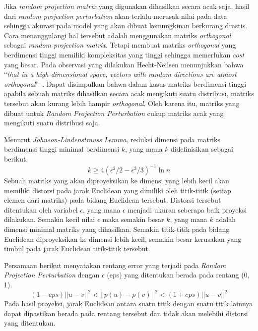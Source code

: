 Jika \textit{random projection matrix} yang digunakan dihasilkan secara acak saja, hasil dari \textit{random projection perturbation} akan terlalu merusak nilai pada data sehingga akurasi pada model yang akan dibuat kemungkinan berkurang drastis. Cara menanggulangi hal tersebut adalah menggunakan matriks \textit{orthogonal} sebagai \textit{random projection matrix}. Tetapi membuat matriks \textit{orthogonal} yang berdimensi tinggi memiliki kompleksitas yang tinggi sehingga memerlukan \textit{cost} yang besar. Pada observasi yang dilakukan Hecht-Neilsen menunjukkan bahwa “\textit{that in a high-dimensional space, vectors with random directions are almost orthogonal}”~\cite{bingham:01:projection}. Dapat disimpulkan bahwa dalam kasus matriks berdimensi tinggi apabila sebuah matriks dihasilkan secara acak mengikuti suatu distribusi, matriks tersebut akan kurang lebih hampir \textit{orthogonal}. Oleh karena itu, matriks yang dibuat untuk \textit{Random Projection Perturbation} cukup matriks acak yang mengikuti suatu distribusi saja.

Menurut \textit{Johnson-Lindenstrauss Lemma}, reduksi dimensi pada matriks berdimensi tinggi minimal berdimensi \(k\), yang mana \(k\) didefinisikan sebagai berikut.
\begin{equation}
	k \geq 4(\epsilon^{2}/2-\epsilon^{3}/3)^{-1}\ln{n}
\end{equation}
Sebuah matriks yang akan diproyeksikan ke dimensi yang lebih kecil akan memiliki distorsi pada jarak Euclidean yang dimiliki oleh titik-titik (setiap elemen dari matriks) pada bidang Euclidean tersebut. Distorsi tersebut ditentukan oleh variabel \(\epsilon\), yang mana \(\epsilon\) menjadi ukuran seberapa baik proyeksi dilakukan. Semakin kecil nilai \(\epsilon\) maka semakin besar \(k\), yang mana \(k\) adalah dimensi minimal matriks yang dihasilkan. Semakin titik-titik pada bidang Euclidean diproyeksikan ke dimensi lebih kecil, semakin besar kerusakan yang timbul pada jarak Euclidean titik-titik tersebut.

Persamaan berikut menyatakan rentang error yang terjadi pada \textit{Random Projection Perturbation} dengan \(\epsilon\) (eps) yang ditentukan berada pada rentang (0, 1). 
\begin{equation}
	(1-eps)||u - v||^{2}<||p(u) - p(v)||^{2}<(1+eps)||u - v||^{2}
\end{equation}
Pada hasil proyeksi, jarak Euclidean antara suatu titik dengan suatu titik lainnya dapat dipastikan berada pada rentang tersebut dan tidak akan melebihi distorsi yang ditentukan.

